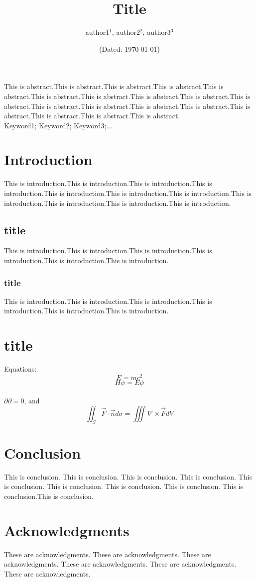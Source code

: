 \documentclass[UTF8]{ctexart}
\title{\textbf{Title}}
\author{\sffamily author1$^1$, \sffamily author2$^2$, \sffamily author3$^3$}
\date{(Dated: \today)}
\begin{document}
    \maketitle
        This is abstract.This is abstract.This is abstract.This is abstract.This is abstract.This is abstract.This is abstract.This is abstract.This is abstract.This is abstract.This is abstract.This is abstract.This is abstract.This is abstract.This is abstract.This is abstract.This is abstract.This is abstract.\\

        Keyword1; Keyword2; Keyword3;...
    \section{Introduction}
    This is introduction.This is introduction\cite{duane1971close}.This is introduction.This is introduction.This is introduction.This is introduction.This is introduction.This is introduction.This is introduction.This is introduction.This is introduction.
    \subsection{title}
    This is introduction.This is introduction.This is introduction.This is introduction.This is introduction.This is introduction.
    \subsubsection{title}
    This is introduction.This is introduction.This is introduction.This is introduction.This is introduction.This is introduction.
    \section{title}
    \noindent Equations: 
    \begin{equation}
        E=mc^2
    \end{equation}
    \begin{equation}
        H\psi=E\psi
    \end{equation}\\
    $\partial\partial=0$, and
    $$\iint_S \vec{F}\cdot \vec{n}d\sigma=\iiint \nabla\times\vec{F}dV$$
    \section{Conclusion}
    This is conclusion. This is conclusion. This is conclusion. This is conclusion. This is conclusion. This is conclusion. This is conclusion. This is conclusion. This is conclusion.This is conclusion.
    \section*{Acknowledgments}
     These are acknowledgments. These are acknowledgments. These are acknowledgments. These are acknowledgments. These are acknowledgments. These are acknowledgments.
\end{document}
